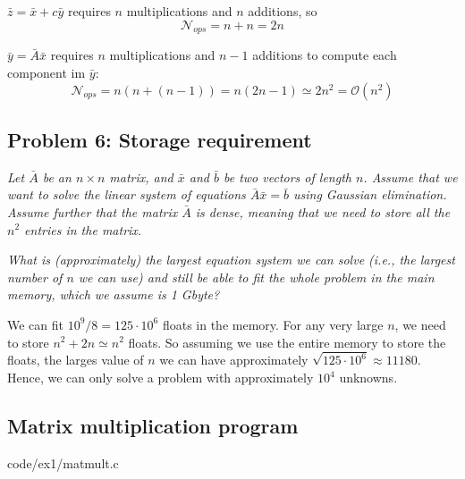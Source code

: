 $\bar{z} = \bar{x} + c \bar{y}$ requires $n$ multiplications and $n$ additions, so
\begin{equation}
  \mathcal{N}_{ops} = n + n = 2n
\end{equation}

$\bar{y} = \bar{A}\bar{x}$ requires $n$ multiplications and $n-1$ additions to compute each component im $\bar{y}$:
\begin{equation}
  \mathcal{N}_{ops} = n(n+(n-1)) = n(2n-1) \simeq 2n^2 = \mathcal{O}(n^2)
\end{equation}


\subsection{Problem 6: Storage requirement} %
\label{sec:exercise_6_storage_requirement}
\begin{question}
  \emph{ Let $\bar{A}$ be an $n \times n$ matrix, and $\bar{x}$ and $\bar{b}$ be two vectors of length $n$. Assume that we want to solve the linear system of equations $\bar{A} \bar{x} = \bar{b}$ using Gaussian elimination. Assume further that the matrix $\bar{A}$ is dense, meaning that we need to store all the $n^2$ entries in the matrix. }

  \emph{What is (approximately) the largest equation system we can solve (i.e., the largest number of $n$ we can use) and still be able to fit the whole problem in the main memory, which we assume is 1 Gbyte?}
\end{question}

We can fit $10^9 / 8 = 125 \cdot 10^6$ floats in the memory. For any very large $n$, we need to store $n^2+2n \simeq n^2$ floats. So assuming we use the entire memory to store the floats, the larges value of $n$ we can have approximately $\sqrt{125\cdot 10^6} \approx 11180$. Hence, we can only solve a problem with approximately $10^4$ unknowns.



\subsection{Matrix multiplication program} %
\label{sec:matrix_multiplication_program}

  {code/ex1/matmult.c}


